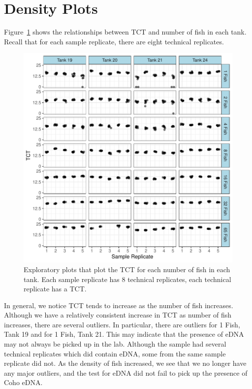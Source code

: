\section{Density Plots}

 
Figure~\ref{lab:introplots122} shows the relationships between TCT and number of fish in each tank. Recall that for each sample replicate, there are eight technical replicates.


\begin{figure}[H]
\includegraphics{Chapter3Images/gt.pdf}
\begin{center}
\caption{ Exploratory plots that plot the TCT for each number of fish in each tank. Each sample replicate has 8 technical replicates, each technical replicate has a TCT. }
\label{lab:introplots122}
\end{center}
\end{figure}








 In general, we notice TCT tends to increase as the number of fish increases. Although we have a relatively consistent increase in TCT as number of fish increases, there are several outliers. In particular, there are outliers for 1 Fish, Tank 19 and for 1 Fish, Tank 21. This may indicate that the presence of eDNA may not always be picked up in the lab. Although the sample had several technical replicates which did contain eDNA, some from the same sample replicate did not. As the density of fish increased, we see that we no longer have any major outliers, and the test for eDNA did not fail to pick up the presence of Coho eDNA.
  

